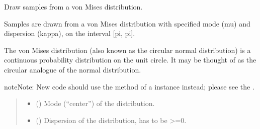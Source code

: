 \documentclass[letterpaper,10pt,english]{sphinxmanual}
\begin{document}
\begin{fulllineitems}
\label{\detokenize{metilda.controllers:metilda.controllers.pitch_art_wizard.vonmises}}
\pysigstartsignatures
{}
\pysigstopsignatures
\sphinxAtStartPar
Draw samples from a von Mises distribution.

\sphinxAtStartPar
Samples are drawn from a von Mises distribution with specified mode
(mu) and dispersion (kappa), on the interval {[}\sphinxhyphen{}pi, pi{]}.

\sphinxAtStartPar
The von Mises distribution (also known as the circular normal
distribution) is a continuous probability distribution on the unit
circle.  It may be thought of as the circular analogue of the normal
distribution.

\begin{sphinxadmonition}{note}{Note:}
\sphinxAtStartPar
New code should use the 
method of a  instance instead;
please see the .
\end{sphinxadmonition}
\begin{quote}\begin{description}
\begin{itemize}
\item {} 
\sphinxAtStartPar
{} () \textendash{} Mode (“center”) of the distribution.

\item {} 
\sphinxAtStartPar
{} () \textendash{} Dispersion of the distribution, has to be \textgreater{}=0.


\end{itemize}
\end{description}
\end{quote}
\end{fulllineitems}
\end{document}
